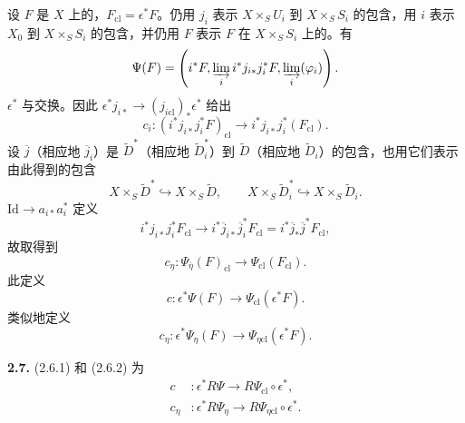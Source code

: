设 $F$ 是 $X$ 上的，$F_{\mathrm{cl}}=\epsilon^*F$。仍用 $j_i$ 表示 $X\times_S U_i$ 到 $X\times_S S_i$ 的包含，用 $i$ 表示 $X_0$ 到 $X\times_S S_i$ 的包含，并仍用 $F$ 表示 $F$ 在 $X\times_S S_i$ 上的。有
\[
 \Psi(F)=\left(i^*F,\varinjlim_i i^*j_{i*}j_i^*F,
                       \varinjlim_i(\varphi_i)\right).
\]
 $\epsilon^*$ 与交换。因此 $\epsilon^*j_{i*}\to(j_{i\mathrm{cl}})_*\epsilon^*$ 给出
\[
 c_i:(i^*j_{i*}j_i^*F)_{\mathrm{cl}}
 \longrightarrow i^*j_{i*}j_i^*(F_{\mathrm{cl}}).
\]
设 $\overline j$（相应地 $\overline j_i$）是 $\widetilde D^*$（相应地 $\widetilde D_i^*$）到 $\widetilde D$（相应地 $\widetilde D_i$）的包含，也用它们表示由此得到的包含
\[
 X\times_S\widetilde D^*\hookrightarrow X\times_S\widetilde D,
 \qquad X\times_S\widetilde D_i^*\hookrightarrow X\times_S\widetilde D_i.
\]
 $\mathrm{Id}\to a_{i*}a_i^*$ 定义
\[
 i^*j_{i*}j_i^*F_{\mathrm{cl}}
 \longrightarrow i^*\overline j_{i*}\overline j_i^*F_{\mathrm{cl}}
 =i^*\overline j_*\overline j^*F_{\mathrm{cl}},
\]
故取得到
\[
 c_\eta:\Psi_{\overline\eta}(F)_{\mathrm{cl}}
 \longrightarrow\Psi_{\mathrm{cl}}(F_{\mathrm{cl}}).
\]
此定义
\[
 c:\epsilon^*\Psi(F)\longrightarrow\Psi_{\mathrm{cl}}(\epsilon^*F).\tag{2.6.1}
\]
类似地定义
\[
 c_\eta:\epsilon^*\Psi_\eta(F)\longrightarrow
 \Psi_{\eta\mathrm{cl}}(\epsilon^*F).\tag{2.6.2}
\]

\textbf{2.7.}  (2.6.1) 和 (2.6.2) 为
\[
\begin{aligned}
 c&:\epsilon^*R\Psi\longrightarrow R\Psi_{\mathrm{cl}}\circ\epsilon^*,\\
 c_\eta&:\epsilon^*R\Psi_\eta\longrightarrow R\Psi_{\eta\mathrm{cl}}\circ\epsilon^*.
\end{aligned}
\]


